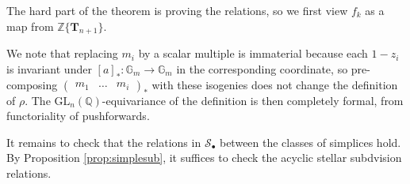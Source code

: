 \documentclass[10pt]{amsart}
\theoremstyle{definition}
\newcommand{\cS}{\mathcal{S}}
\numberwithin{equation}{section}
\begin{document}
    The hard part of the theorem is proving the relations, so we first view $f_k$ as a map from $\mathbb{Z}\{\mathbf{T}_{n+1}\}$. 
    
    We note that replacing $m_i$ by a scalar multiple is immaterial because each $1-z_i$ is invariant under $[a]_*:\mathbb{G}_m\to \mathbb{G}_m$ in the corresponding coordinate, so pre-composing $\begin{pmatrix}m_1&\ldots & m_i\end{pmatrix}_*$ with these isogenies does not change the definition of $\rho$. The $\mathrm{GL}_n(\mathbb{Q})$-equivariance of the definition is then completely formal, from functoriality of pushforwards.
    
    It remains to check that the relations in $\cS_\bullet$ between the classes of simplices hold. By Proposition \ref{prop:simplesub}, it suffices to check the acyclic stellar subdvision relations.
    
\end{document}
